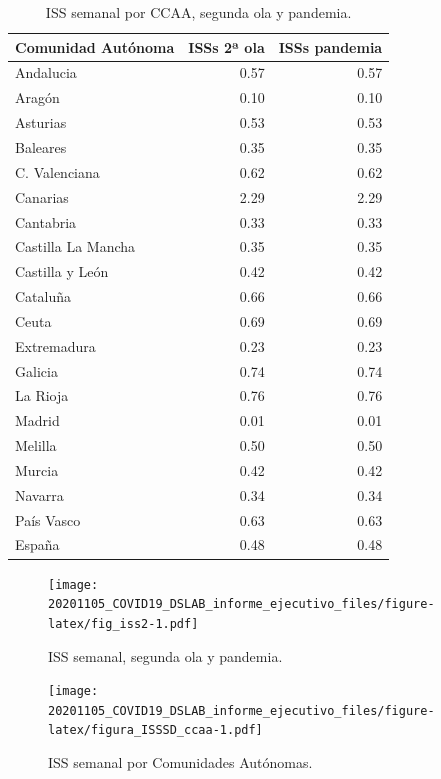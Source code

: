 \documentclass[
  11pt,
]{article}
\begin{document}
\begin{table}[!h]

\caption{\label{tab:tabla2}ISS semanal por CCAA, segunda ola y pandemia.}
\centering
\fontsize{9}{11}\selectfont
\begin{tabular}[t]{l|r|r}
\hline
Comunidad Autónoma & ISSs 2ª ola & ISSs pandemia\\
\hline
Andalucia & 0.57 & 0.57\\
\hline
Aragón & 0.10 & 0.10\\
\hline
Asturias & 0.53 & 0.53\\
\hline
Baleares & 0.35 & 0.35\\
\hline
C. Valenciana & 0.62 & 0.62\\
\hline
Canarias & 2.29 & 2.29\\
\hline
Cantabria & 0.33 & 0.33\\
\hline
Castilla La Mancha & 0.35 & 0.35\\
\hline
Castilla y León & 0.42 & 0.42\\
\hline
Cataluña & 0.66 & 0.66\\
\hline
Ceuta & 0.69 & 0.69\\
\hline
Extremadura & 0.23 & 0.23\\
\hline
Galicia & 0.74 & 0.74\\
\hline
La Rioja & 0.76 & 0.76\\
\hline
Madrid & 0.01 & 0.01\\
\hline
Melilla & 0.50 & 0.50\\
\hline
Murcia & 0.42 & 0.42\\
\hline
Navarra & 0.34 & 0.34\\
\hline
País Vasco & 0.63 & 0.63\\
\hline
España & 0.48 & 0.48\\
\hline
\end{tabular}
\end{table}

\begin{figure}
\centering
\texttt{[image: 20201105\_COVID19\_DSLAB\_informe\_ejecutivo\_files/figure-latex/fig\_iss2-1.pdf]}
\caption{\label{fig:fig_iss2} ISS semanal, segunda ola y pandemia.}
\end{figure}

\begin{figure}
\centering
\texttt{[image: 20201105\_COVID19\_DSLAB\_informe\_ejecutivo\_files/figure-latex/figura\_ISSSD\_ccaa-1.pdf]}
\caption{\label{fig:figura_ISSSD_ccaa} ISS semanal por Comunidades
Autónomas.}
\end{figure}
\end{document}
